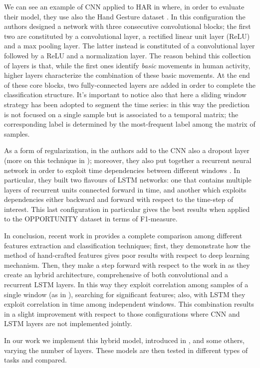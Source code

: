 We can see an example of CNN applied to HAR in \cite{yang2015deep} where, in order to evaluate their model, they use also the Hand Gesture dataset \cite{bulling2014tutorial}. In this configuration the authors designed a network with three consecutive convolutional blocks; the first two are constituted by a convolutional layer, a rectified linear unit layer (ReLU) and a max pooling layer. The latter instead is constituted of a convolutional layer followed by a ReLU and a normalization layer. The reason behind this collection of layers is that, while the first ones identify \textit{basic} movements in human activity, higher layers characterize the combination of these basic movements. At the end of these core blocks, two fully-connected layers are added in order to complete the classification structure. It's important to notice also that here a sliding window strategy has been adopted to segment the time series: in this way the prediction is not focused on a single sample but is associated to a temporal matrix; the corresponding label is determined by the most-frequent label among the matrix of samples.

As a form of regularization, in \cite{hammerla2016deep} the authors add to the CNN also a dropout layer (more on this technique in \cite{srivastava2014dropout}); moreover, they also put together a recurrent neural network in order to exploit time dependencies between different windows . In particular, they built two flavours of LSTM networks: one that contains multiple layers of recurrent units connected forward in time, and another which exploits dependencies either backward and forward with respect to the time-step of interest. This last configuration in particular gives the best results when applied to the OPPORTUNITY dataset in terms of F1-measure.

In conclusion, recent work in \cite{li2018comparison} provides a complete comparison among different features extraction and classification techniques; first, they demonstrate how the method of hand-crafted features gives poor results with respect to deep learning mechanism. Then, they make a step forward with respect to the work in \cite{hammerla2016deep} as they create an hybrid architecture, comprehensive of both convolutional and a recurrent LSTM layers. In this way they exploit correlation among samples of a single window (as in \cite{yang2015deep}), searching for significant features; also, with LSTM they exploit correlation in time among independent windows. This combination results in a slight improvement with respect to those configurations where CNN and LSTM layers are not implemented jointly.

In our work we implement this hybrid model, introduced in \cite{li2018comparison} , and some others, varying the number of layers. These models are then tested in different types of tasks and compared.